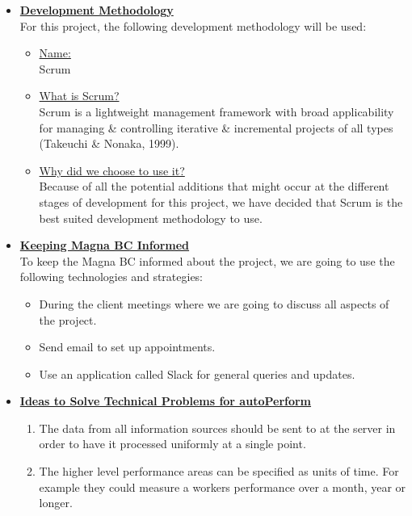 \documentclass[a4paper,12pt]{article}
\begin{document}
\begin{itemize}
\item {\large \underline{\textbf{Development Methodology}}}\\[0.2cm]
For this project, the following development methodology will be used:

	\begin{itemize}
 		\item \underline{Name:}
		\\[0.1cm]
		 Scrum
		\item  \underline{What is Scrum?}
		\\[0.1cm]
		Scrum is a lightweight management framework with broad applicability for managing \& controlling iterative \& 				incremental projects of all types (Takeuchi \& Nonaka, 1999).
		\item \underline{Why did we choose to use it?}
		\\[0.1cm]
		Because of all the potential additions that might occur at the different stages of development for this project, we 			have decided that Scrum is the best suited development methodology to use.
	\end{itemize}
\bigskip

\item {\large \underline{\textbf{Keeping Magna BC Informed}}}\\[0.2cm]
To keep the Magna BC informed about the project, we are going to use the following technologies and strategies:

	\begin{itemize}
	\item During the client meetings where we are going to discuss all aspects of the project.
	\item Send email to set up appointments.
	\item Use an application called Slack for general queries and updates.
	\end{itemize} 

\bigskip
\item {\large \underline{\textbf{Ideas to Solve Technical Problems for autoPerform}}}

\begin{enumerate}
    \item The data from all information sources should be sent to at the server in order to have it processed uniformly at a single point.
    \item The higher level performance areas can be specified as units of time. For example  they could measure a workers performance over a month, year or longer.
\end{enumerate}


\end{itemize}
\end{document}
